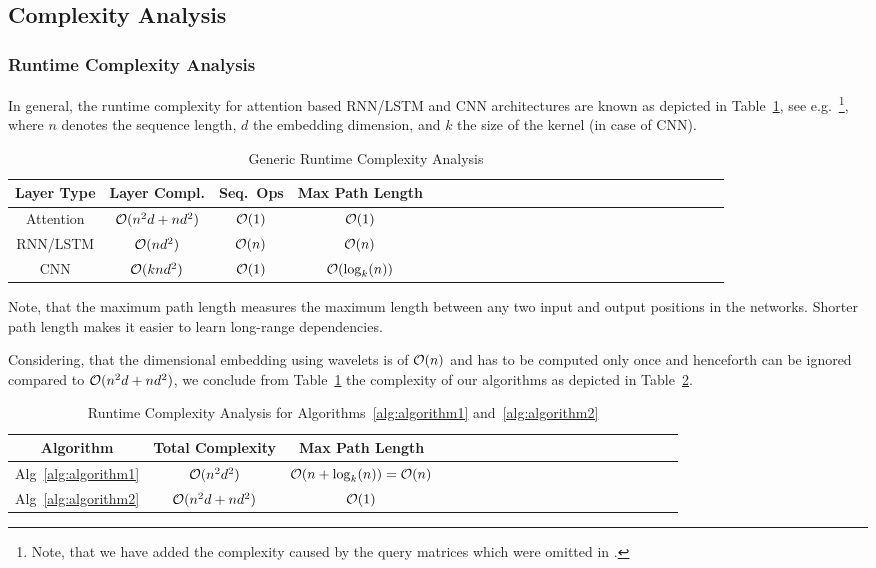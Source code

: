 \documentclass{ieeeaccess}
\begin{document}
 \subsection{Complexity Analysis}
\subsubsection{Runtime Complexity Analysis}
In general, the runtime complexity for attention based RNN/LSTM and CNN architectures are known as depicted in Table~\ref{tbl:genericRuntimeComplexityAnalysis}, see e.g.~\cite{VaswaniEtAl}\footnote{Note, that we have added the complexity caused by the query matrices which were omitted in \cite{VaswaniEtAl}.}, where $n$ denotes the sequence length, $d$ the embedding dimension, and $k$ the size of the kernel (in case of CNN).

\begin{table}[!ht]
    \centering%
    \caption{Generic Runtime Complexity Analysis
    \label{tbl:genericRuntimeComplexityAnalysis}}

    \small
    \begin{tabular}{*{5}{c|cccc}}
          \toprule
    \textbf{Layer Type} &\textbf{Layer Compl.} &\textbf{Seq.\ Ops} &\textbf{Max Path Length}
      \\\midrule
	Attention		& ${\cal O} (n^2 d+ n d^2)$	& ${\cal O} (1)$	& ${\cal O} (1)$\\
	RNN/LSTM	& ${\cal O} ( n d^2)$			& ${\cal O} (n)$	& ${\cal O} (n)$\\
	CNN			& ${\cal O} (k n d^2)$		& ${\cal O} (1)$	& ${\cal O} (\log_k (n))$\\
         \bottomrule
    \end{tabular}    
\end{table}
Note, that the maximum path length measures the maximum length between any two input and output positions in the networks.  Shorter path length makes it easier to learn long-range dependencies.

Considering, that the dimensional embedding using wavelets is of ${\cal O} (n)$ and has to be computed only once and henceforth can be ignored compared to ${\cal O} (n^2 d+ n d^2)$, we conclude from Table~\ref{tbl:genericRuntimeComplexityAnalysis} the complexity of our algorithms as depicted in Table~\ref{tbl:runtimeComplexityAnalysisConmbined}.
\begin{table}[!ht]
    \centering%
    \caption{Runtime Complexity Analysis for Algorithms~\ref{alg:algorithm1} and~\ref{alg:algorithm2}}

    \label{tbl:runtimeComplexityAnalysisConmbined}

    \small  
    \begin{tabular}{*{5}{c|ccc}}
          \toprule
    \textbf{Algorithm} &\textbf{Total Complexity}  &\textbf{Max Path Length}
      \\\midrule
	Alg~\ref{alg:algorithm1} 	& ${\cal O} (n^2 d^2)$		& ${\cal O} (n + \log_k (n))={\cal O} (n) $\\
	Alg~\ref{alg:algorithm2}	& ${\cal O} (n^2 d+ n d^2 )$	& ${\cal O} (1)$\\
         \bottomrule
    \end{tabular}    
\end{table}
\end{document}
